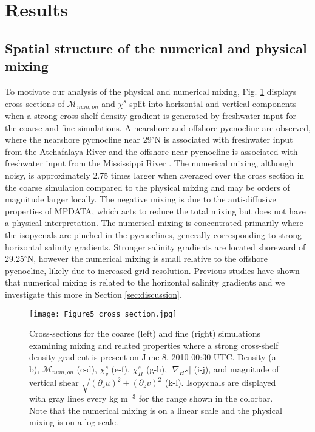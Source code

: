 \documentclass[draft]{agujournal2019}
\begin{document}
\section{Results} \label{sec:results}

\subsection{Spatial structure of the numerical and physical mixing}

To motivate our analysis of the physical and numerical mixing, Fig. \ref{fig:cross_section} displays cross-sections of $\mathcal{M}_{num, on}$ and $\chi^s$ split into horizontal and vertical components when a strong cross-shelf density gradient is generated by freshwater input for the coarse and fine simulations. A nearshore and offshore pycnocline are observed, where the nearshore pycnocline near 29$^\circ$N is associated with freshwater input from the Atchafalaya River and the offshore near pycnocline is associated with freshwater input from the Mississippi River \cite{Kobashi_2020}. The numerical mixing, although noisy, is approximately 2.75 times larger when averaged over the cross section in the coarse simulation compared to the physical mixing and may be orders of magnitude larger locally. The negative mixing is due to the anti-diffusive properties of MPDATA, which acts to reduce the total mixing but does not have a physical interpretation. The numerical mixing is concentrated primarily where the isopycnals are pinched in the pycnoclines, generally corresponding to strong horizontal salinity gradients. Stronger salinity gradients are located shoreward of 29.25$^{\circ}$N, however the numerical mixing is small relative to the offshore pycnocline, likely due to increased grid resolution. Previous studies have shown that numerical mixing is related to the horizontal salinity gradients \cite{hofmeister2011realistic, Kalra_2019, Klingbeil_2014,Wang_2021} and we investigate this more in Section \ref{sec:discussion}.

\begin{figure}
 \centerline{\texttt{[image: Figure5\_cross\_section.jpg]}}
  \caption{Cross-sections for the coarse (left) and fine (right) simulations examining mixing and related properties where a strong cross-shelf density gradient is present on June 8, 2010 00:30 UTC. Density (a-b), $\mathcal{M}_{num, on}$ (c-d), $\chi_v^s$ (e-f), $\chi_H^s$ (g-h), $|\nabla_H s|$ (i-j), and magnitude of vertical shear $\sqrt{(\partial_z u)^2+(\partial_z v)^2}$ (k-l). Isopycnals are displayed with gray lines every kg m$^{-3}$ for the range shown in the colorbar. Note that the numerical mixing is on a linear scale and the physical mixing is on a log scale.}
  \label{fig:cross_section}
\end{figure}
\end{document}
